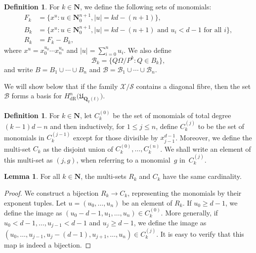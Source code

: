 \documentclass[a4paper,11pt]{article}
\numberwithin{equation}{section}
\providecommand{\abs}[1]{\lvert#1\rvert}                 %
\newcommand{\NN}{\mathbf{N}} %
\newcommand{\QQ}{\mathbf{Q}} %
\renewcommand{\to}{\rightarrow}        %
\providecommand{\HdR}{H_{\text{dR}}}    %
\providecommand{\cB}{\mathcal{B}} %
\theoremstyle{definition}
\newtheorem{lem}[thm]{Lemma}
\newtheorem{defn}[thm]{Definition}
\begin{document}
\begin{defn} \label{defn:MonBasis}
For $k \in \NN$, we define the following sets of monomials: 
\begin{align*}
F_k & = \{ x^u : u \in \mathbf{N}_{0}^{n+1}, \abs{u} = k d - (n+1) \}, \\
B_k & = \{ x^u : u \in \mathbf{N}_{0}^{n+1}, \abs{u} = k d - (n+1) \text{ and $u_i < d-1$ for all $i$}\}, \\
R_k & = F_k - B_k,
\end{align*}
where $x^u = x_0^{u_0} \dotsm x_n^{u_n}$ and $\abs{u}=\sum_{i=0}^n u_i$. 
We also define 
\begin{equation*}
\cB_k = \{Q \Omega / P^k : Q \in B_k\}, 
\end{equation*}
and write $B = B_1 \cup \dotsb \cup B_n$ and $\cB = \cB_1 \cup \dotsb \cup \cB_n$.
\end{defn}

We will show below that if the family $\mathcal{X}/{\mathcal{S}}$ contains 
a diagonal fibre, then the set $\cB$ forms a basis for 
$\HdR^n\bigl(\mathfrak{U}_{\QQ_q(t)}\bigr)$.

\begin{defn} \label{defn:IndexSets}
For $k \in \NN$, let $C_k^{(0)}$ be the set of monomials of total 
degree $(k-1)d - n$ and then inductively, for $1 \leq j \leq n$, define 
$C_k^{(j)}$ to be the set of monomials in $C_k^{(j-1)}$ except for those 
divisible by $x_{j-1}^{d-1}$.  Moreover, we define the multi-set $C_k$ as 
the disjoint union of $C_k^{(0)}, \dotsc, C_k^{(n)}$.  We shall write an 
element of this multi-set as $(j, g)$, when referring to a monomial~$g$ 
in~$C_k^{(j)}$.
\end{defn}

\begin{lem} \label{lem:bijection}
For all $k \in \NN$, the multi-sets $R_k$ and $C_k$ 
have the same cardinality.
\end{lem}

\begin{proof}
We construct a bijection $R_k \to C_k$, representing the 
monomials by their exponent tuples.  Let $u = (u_0, \dotsc, u_n)$ be an
element of $R_k$.  If $u_0 \geq d-1$, we define the image as
$(u_0-d-1, u_1, \dotsc, u_n) \in C_k^{(0)}$.  More generally, if 
$u_0 < d-1, \dotsc, u_{j-1} < d-1$ and $u_j \geq d-1$, we define the image as 
$(u_0, \dotsc, u_{j-1}, u_j-(d-1), u_{j+1}, \dotsc, u_n) \in C_k^{(j)}$.  
It is easy to verify that this map is indeed a bijection.
\end{proof}
\end{document}
